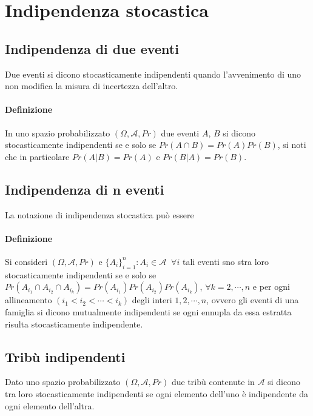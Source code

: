 \chapter{Indipendenza stocastica}
\section{Indipendenza di due eventi}
Due eventi si dicono stocasticamente indipendenti quando l'avvenimento di uno non modifica la misura di incertezza dell'altro.
\subsubsection{Definizione}
In uno spazio probabilizzato $(\Omega,\mathcal{A},Pr)$ due eventi $A$, $B$ si dicono stocasticamente indipendenti se e solo se $Pr(A\cap B)=Pr(A)Pr(B)$, si noti
che in particolare $Pr(A|B)=Pr(A)$ e $Pr(B|A)=Pr(B)$.
\section{Indipendenza di n eventi}
La notazione di indipendenza stocastica pu\`o essere 
\subsubsection{Definizione}
Si consideri $(\Omega,\mathcal{A},Pr)$ e $\{A_i\}_{i=1}^n:A_i\in \mathcal{A}\;\;\forall i$ tali eventi sno stra loro stocasticamente indipendenti se e solo se 
$Pr(A_{i_1}\cap A_{i_2}\cap A_{i_k})=Pr(A_{i_1})Pr(A_{i_2})Pr(A_{i_k})$, $\forall k=2,\cdots,n$ e per ogni allineamento $(i_1<i_2<\cdots<i_k)$ degli interi $1,2,
\cdots, n$, ovvero gli eventi di una famiglia si dicono mutualmente indipendenti se ogni ennupla da essa estratta risulta stocasticamente indipendente.
\section{Trib\`u indipendenti}
Dato uno spazio probabilizzato $(\Omega,\mathcal{A},Pr)$ due trib\`u contenute in $\mathcal{A}$ si dicono tra loro stocasticamente indipendenti se ogni elemento 
dell'uno \`e indipendente da ogni elemento dell'altra.